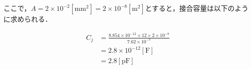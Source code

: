 \documentclass{classes/report}
\begin{document}
ここで，$A = 2 \times 10^{-2} [\mathrm{mm}^2] = 2 \times 10^{-8} [\mathrm{m}^2]$とすると，接合容量は以下のように求められる．

\begin{equation}
    \begin{split}
        C_{j} &= \frac{8.854 \times 10^{-12} \times 12 \times 2 \times 10^{-8}}{7.62 \times 10^{-7}} \\
        &= 2.8 \times 10^{-12} [\mathrm{F}] \\
        &= 2.8 [\mathrm{pF}]
    \end{split}
\end{equation}
\end{document}

